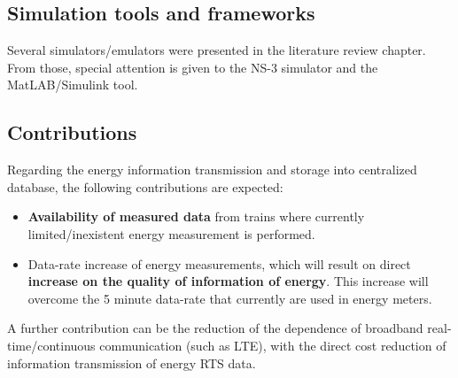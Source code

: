 \subsection{Simulation tools and frameworks}

Several simulators/emulators were presented in the literature review chapter. From those, special attention is given to the NS-3 simulator and the MatLAB/Simulink tool.  


\subsection{Contributions}

Regarding the energy information transmission and storage into centralized database, the following contributions are expected:

\begin{itemize}
	\setlength\itemsep{0em}
	
	\item \textbf{Availability of measured data} from trains where currently limited/inexistent energy measurement is performed.
	
	\item Data-rate increase of energy measurements, which will result on direct \textbf{increase on the quality of information of energy}. This increase will overcome the 5 minute data-rate that currently are used in energy meters.
	
\end{itemize}

A further contribution can be the reduction of the dependence of broadband real-time/continuous communication (such as \ac{LTE}), with the direct cost reduction of information transmission of energy \ac{RTS} data.

	
	
